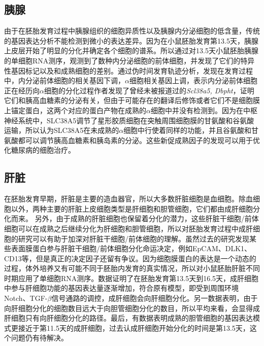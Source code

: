 \documentclass[lang=cn]{elegantpaper}
\begin{document}
\subsection{胰腺}
由于在胚胎发育过程中胰腺组织的细胞异质性以及胰腺内分泌细胞的低含量，传统的基因表达分析不能检测到微小的表达差异\citep{saliba_single-cell_2014}。因为在小鼠胚胎发育第13.5天，胰腺上皮层开始了明显的分化并确定各个细胞的谱系\citep{pan_pancreas_2011}。所以通过对13.5天小鼠胚胎胰腺的单细胞RNA测序，\cite{stanescu_single_2017}观测到了数种内分泌细胞的前体细胞，并发现了它们的特异性基因标记以及和成熟细胞的差别。通过伪时间发育轨迹分析，\cite{stanescu_single_2017}发现在发育过程中，内分泌前体细胞的相关基因下调，$\alpha$细胞相关基因上调，表示内分泌前体细胞正在经历向$\alpha$细胞的分化过程作者发现了曾经未被报道过的\emph{Scl38a5, Dbpht}，证明它们和胰高血糖素的分泌有关，但由于可能存在的翻译后修饰或者它们不是细胞膜上锚定蛋白，这两个对应的蛋白产物在成熟的$\alpha$细胞中并没有检测到\citep{xin_use_2016}。因为在中枢神经系统中，SLC38A5调节了星形胶质细胞在突触周围细胞膜的甘氨酸和谷氨酸运输\citep{hamdani_system_2012}，所以\cite{stanescu_single_2017}认为SLC38A5在未成熟的$\alpha$细胞中行使着同样的功能，并且谷氨酸和甘氨酸都可以调节胰高血糖素和胰岛素的分泌\citep{gao_glucose_1999}。这些新促成熟因子的发现可以用于优化糖尿病的细胞治疗。

\subsection{肝脏}
在胚胎发育早期，肝脏是主要的造血器官，所以大多数肝脏细胞是血细胞\citep{miyajima_stem/progenitor_2014}。除血细胞以外，两种主要的肝脏上皮细胞类型是肝细胞和胆管细胞，它们都由成肝细胞分化而来\citep{gordillo_orchestrating_2015}。
另外，由于成熟的肝脏细胞也保留着分化的潜力，这些肝脏干细胞/前体细胞可以在成熟之后继续分化为肝细胞和胆管细胞\citep{miyajima_stem/progenitor_2014}，所以对胚胎发育过程中成肝细胞的研究可以有助于加深对肝脏干细胞/前体细胞的理解。虽然过去的研究发现某些表面膜蛋白参与肝脏干细胞/前体细胞分化命运决定，例如EpCAM、DLK1、CD13\citep{okabe_potential_2009,tanimizu_isolation_2003,kakinuma_analyses_2009}等，但是真正的决定因子还留有争议。因为细胞膜蛋白的表达是一个动态的过程，体外培养又有可能不同于胚胎内发育的真实情况，所以\cite{su_single-cell_2017}对小鼠胚胎肝脏不同时期应用了单细胞RNA测序。数据证明了在胚胎发育第13.5天到16.5天，成肝细胞中参与肝细胞功能的基因表达量逐渐增加，符合原有模型，即受到周围环境Notch、TGF-$\beta$信号通路的调控，成肝细胞会向肝细胞分化\citep{zong_notch_2009}。另一数据表明，由于向肝细胞分化的细胞数目远大于向胆管细胞分化的数目，所以平均来看，会显得成肝细胞只有向肝细胞分化的路径。最后，有数据表明成熟的胆管细胞的基因表达模式更接近于第11.5天的成肝细胞，过去认成肝细胞开始分化的时间是第13.5天\citep{chaudhari_expression_2016}，这个问题仍有待解决。

\end{document}
